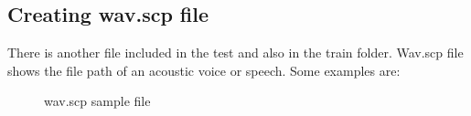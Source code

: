 \documentclass{standalone}
\begin{document}
    \subsection{Creating wav.scp file}
      There is another file included in the test and also in the train folder. Wav.scp file shows the file path of an acoustic voice or speech. Some examples are:
    \\
    \begin{figure}[h]
 \centering
 \caption{wav.scp sample file}
\label{fig:wavscp}
\end{figure}
\end{document}
